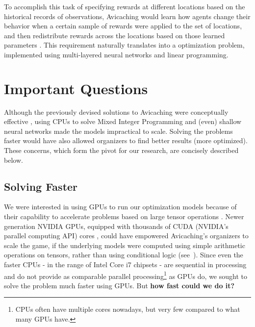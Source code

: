 To accomplish this task of specifying rewards at different locations based on the historical records of observations, Avicaching would learn how agents change their behavior when a certain sample of rewards were applied to the set of locations, and then redistribute rewards across the locations based on those learned parameters \cite{Xue2016Avi2}. This requirement naturally translates into a  optimization problem, implemented using multi-layered neural networks and linear programming.

\section{Important Questions} \label{sec:Important Questions}
Although the previously devised solutions to Avicaching were conceptually effective \cite{Xue2016Avi1, Xue2016Avi2}, using CPUs to solve Mixed Integer Programming and (even) shallow neural networks made the models impractical to scale. Solving the problems faster would have also allowed organizers to find better results (more optimized). These concerns, which form the pivot for our research, are concisely described below.

\subsection{Solving Faster} \label{sec:Important Questions - Solving Faster}
We were interested in using GPUs to run our optimization models because of their capability to accelerate problems based on large tensor operations \cite{ParallelNVIDIA, cuDNNPaper}. Newer generation NVIDIA GPUs, equipped with thousands of CUDA (NVIDIA's parallel computing API) cores \cite{NVIDIA}, could have empowered Avicaching's organizers to scale the game, if the underlying models were computed using simple arithmetic operations on tensors, rather than using conditional logic (see~). Since even the faster CPUs - in the range of Intel Core i7 chipsets - are sequential in processing and do not provide as comparable parallel processing\footnote{CPUs often have multiple cores nowadays, but very few compared to what many GPUs have.} as GPUs do, we sought to solve the problem much faster using GPUs. But \textbf{how fast could we do it?}

